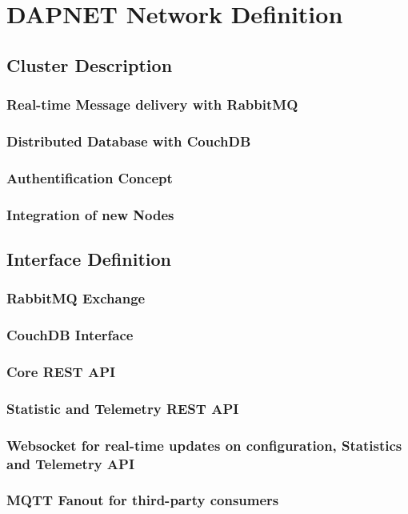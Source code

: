 \chapter{DAPNET Network Definition}


\section{Cluster Description}

\subsection{Real-time Message delivery with RabbitMQ}

\subsection{Distributed Database with CouchDB}

\subsection{Authentification Concept}

\subsection{Integration of new Nodes}


\section{Interface Definition}

\subsection{RabbitMQ Exchange}

\subsection{CouchDB Interface}

\subsection{Core REST API}

\subsection{Statistic and Telemetry REST API}

\subsection{Websocket for real-time updates on configuration, Statistics and Telemetry API}

\subsection{MQTT Fanout for third-party consumers}
